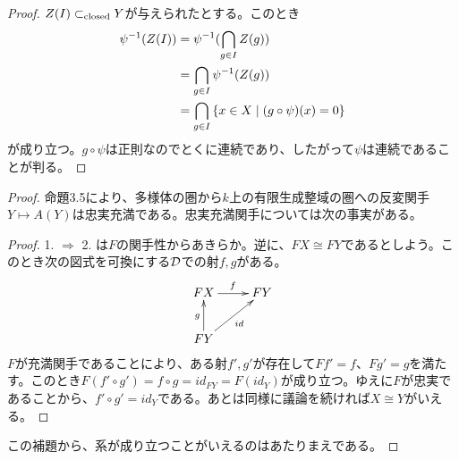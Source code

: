 \begin{proof}
  $Z(I) \subset_{\text{closed}} Y$が与えられたとする。このとき
  \begin{align*}
    \psi^{-1}(Z(I)) &= \psi^{-1}(\bigcap_{g \in I} Z(g)) \\
    &= \bigcap_{g \in I} \psi^{-1}(Z(g)) \\
    &= \bigcap_{g \in I} \left\{ x \in X \mathrel{} \middle| \mathrel{} (g \circ \psi )(x) = 0 \right\}
  \end{align*}
  が成り立つ。$g \circ \psi$は正則なのでとくに連続であり、したがって$\psi$は連続であることが判る。
\end{proof}






\begin{proof}
  命題3.5により、多様体の圏から$k$上の有限生成整域の圏への反変関手$Y \mapsto A(Y)$は忠実充満である。忠実充満関手については次の事実がある。
  \begin{proof}
    1. $\Rightarrow$ 2. は$F$の関手性からあきらか。逆に、$FX \cong FY$であるとしよう。このとき次の図式を可換にする$\mathcal{D}$での射$f,g$がある。
    \[
    \xymatrix{
    FX \ar[r]^f & FY \\
    FY \ar[u]^g \ar[ur]_{id} & {}
    }
    \]
    $F$が充満関手であることにより、ある射$f',g'$が存在して$Ff'=f$、$Fg'=g$を満たす。このとき$F(f' \circ g')= f \circ g = id_{FY} = F(id_Y)$が成り立つ。ゆえに$F$が忠実であることから、$f' \circ g' = id_Y$である。あとは同様に議論を続ければ$X \cong Y$がいえる。
  \end{proof}

この補題から、系が成り立つことがいえるのはあたりまえである。
\end{proof}



